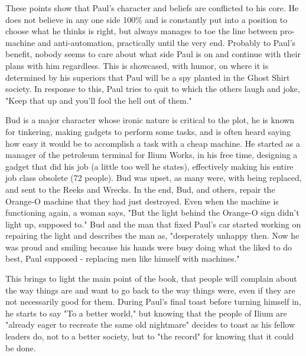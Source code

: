 These points show that Paul's character and beliefs are conflicted to his core.
He does not believe in any one side 100\% and is constantly put into a position to choose what he thinks is right, but always manages to toe the line between pro-machine and anti-automation, practically until the very end.
Probably to Paul's benefit, nobody seems to care about what side Paul is on and continue with their plans with him regardless.
This is showcased, with humor, on \autocite[142]{kurt1} where it is determined by his superiors that Paul will be a spy planted in the Ghost Shirt society.
In response to this, Paul tries to quit to which the others laugh and joke, "Keep that up and you'll fool the hell out of them."

Bud is a major character whose ironic nature is critical to the plot, he is known for tinkering, making gadgets to perform some tasks, and is often heard saying how easy it would be to accomplish a task with a cheap machine.
He started as a manager of the petroleum terminal for Ilium Works, in his free time, designing a gadget that did his job (a little too well he states), effectively making his entire job class obsolete (72 people).
Bud was upset, as many were, with being replaced, and sent to the Reeks and Wrecks.
In the end, Bud, and others, repair the Orange-O machine that they had just destroyed.
Even when the machine is functioning again, a woman says, "But the light behind the Orange-O sign didn't light up, supposed to."
Bud and the man that fixed Paul's car started working on repairing the light and describes the man as, "desperately unhappy then. Now he was proud and smiling because his hands were busy doing what the liked to do best, Paul supposed - replacing men like himself with machines." \autocite[204]{kurt1}

This brings to light the main point of the book, that people will complain about the way things are and want to go back to the way things were, even if they are not necessarily good for them.
During Paul's final toast before turning himself in, he starts to say "To a better world," but knowing that the people of Ilium are "already eager to recreate the same old nightmare" decides to toast as his fellow leaders do, not to a better society, but to "the record" for knowing that it could be done. \autocite[205--206]{kurt1}
 

